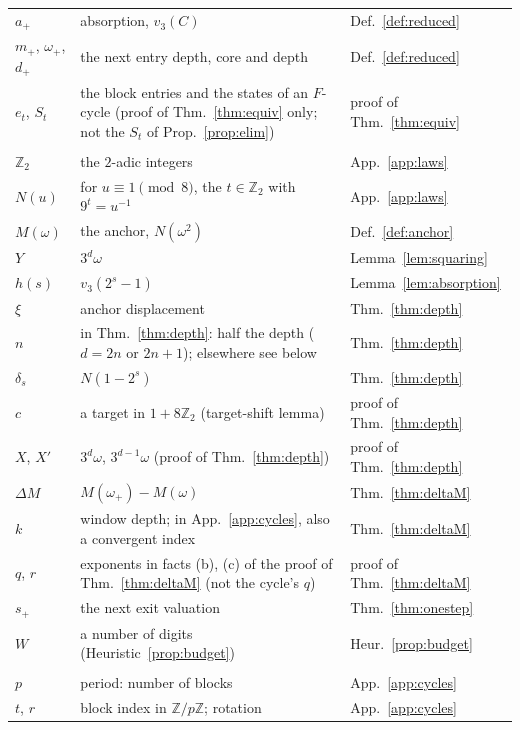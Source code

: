 \documentclass[11pt]{article}
\theoremstyle{remark}
\newcommand{\Z}{\mathbb{Z}}
\newcommand{\vth}[1]{v_3\!\left(#1\right)}
\newcommand{\w}{\omega}
\begin{document}
{\begin{longtable}{>{\raggedright\arraybackslash}p{}>{\raggedright\arraybackslash}p{}>{\raggedright\arraybackslash}p{}}
$a_+$ & absorption, $\vth{C}$ & Def.~\ref{def:reduced} \\
$m_+$, $\w_+$, $d_+$ & the next entry depth, core and depth & Def.~\ref{def:reduced} \\
$e_t$, $S_t$ & the block entries and the states of an $F$-cycle (proof of Thm.~\ref{thm:equiv} only; not the $S_t$ of Prop.~\ref{prop:elim}) & proof of Thm.~\ref{thm:equiv} \\
\multicolumn{3}{l}{\emph{The exact laws (Appendix~\ref{app:laws})}} \\
$\Z_2$ & the $2$-adic integers & App.~\ref{app:laws} \\
$N(u)$ & for $u \equiv 1 \pmod 8$, the $t \in \Z_2$ with $9^t = u^{-1}$ & App.~\ref{app:laws} \\
$M(\w)$ & the anchor, $N(\w^2)$ & Def.~\ref{def:anchor} \\
$Y$ & $3^d\w$ & Lemma~\ref{lem:squaring} \\
$h(s)$ & $\vth{2^s - 1}$ & Lemma~\ref{lem:absorption} \\
$\xi$ & anchor displacement & Thm.~\ref{thm:depth} \\
$n$ & in Thm.~\ref{thm:depth}: half the depth ($d = 2n$ or $2n+1$); elsewhere see below & Thm.~\ref{thm:depth} \\
$\delta_s$ & $N(1 - 2^s)$ & Thm.~\ref{thm:depth} \\
$c$ & a target in $1 + 8\Z_2$ (target-shift lemma) & proof of Thm.~\ref{thm:depth} \\
$X$, $X'$ & $3^d\w$, $3^{d-1}\w$ (proof of Thm.~\ref{thm:depth}) & proof of Thm.~\ref{thm:depth} \\
$\Delta M$ & $M(\w_+) - M(\w)$ & Thm.~\ref{thm:deltaM} \\
$k$ & window depth; in App.~\ref{app:cycles}, also a convergent index & Thm.~\ref{thm:deltaM} \\
$q$, $r$ & exponents in facts (b), (c) of the proof of Thm.~\ref{thm:deltaM} (not the cycle's $q$) & proof of Thm.~\ref{thm:deltaM} \\
$s_+$ & the next exit valuation & Thm.~\ref{thm:onestep} \\
$W$ & a number of digits (Heuristic~\ref{prop:budget}) & Heur.~\ref{prop:budget} \\
\multicolumn{3}{l}{\emph{Cycles (Appendix~\ref{app:cycles})}} \\
$p$ & period: number of blocks & App.~\ref{app:cycles} \\
$t$, $r$ & block index in $\Z/p\Z$; rotation & App.~\ref{app:cycles} \\

\end{longtable}}
\end{document}
